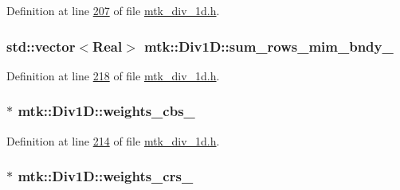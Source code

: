 Definition at line \hyperlink{mtk__div__1d_8h_source_l00207}{207} of file \hyperlink{mtk__div__1d_8h_source}{mtk\+\_\+div\+\_\+1d.\+h}.

\hypertarget{classmtk_1_1Div1D_a1df70645f34490a70b3437c0122f5646}{
\subsubsection[{sum\+\_\+rows\+\_\+mim\+\_\+bndy\+\_\+}]{\setlength{\rightskip}{0pt plus 5cm}std\+::vector$<${\bf Real}$>$ mtk\+::\+Div1\+D\+::sum\+\_\+rows\+\_\+mim\+\_\+bndy\+\_\+\hspace{0.3cm}{\ttfamily [private]}}}\label{classmtk_1_1Div1D_a1df70645f34490a70b3437c0122f5646}


Definition at line \hyperlink{mtk__div__1d_8h_source_l00218}{218} of file \hyperlink{mtk__div__1d_8h_source}{mtk\+\_\+div\+\_\+1d.\+h}.

\hypertarget{classmtk_1_1Div1D_a631dad42a0ec0f5d5ac767abdfd8949c}{
\subsubsection[{weights\+\_\+cbs\+\_\+}]{$\ast$ mtk\+::\+Div1\+D\+::weights\+\_\+cbs\+\_\+\hspace{0.3cm}{\ttfamily [private]}}}\label{classmtk_1_1Div1D_a631dad42a0ec0f5d5ac767abdfd8949c}


Definition at line \hyperlink{mtk__div__1d_8h_source_l00214}{214} of file \hyperlink{mtk__div__1d_8h_source}{mtk\+\_\+div\+\_\+1d.\+h}.

\hypertarget{classmtk_1_1Div1D_ad36dcfade921f0488fe3edaecc17bd75}{
\subsubsection[{weights\+\_\+crs\+\_\+}]{$\ast$ mtk\+::\+Div1\+D\+::weights\+\_\+crs\+\_\+\hspace{0.3cm}{\ttfamily [private]}}}\label{classmtk_1_1Div1D_ad36dcfade921f0488fe3edaecc17bd75}



